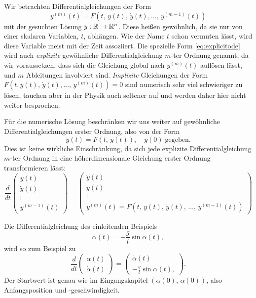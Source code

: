 Wir betrachten Differentialgleichungen der Form
\begin{equation}
  \label{eq:explicitode}
  y^{(m)}(t) = F(t,\, y(t),\, \dot y(t), \ldots,\, y^{(m-1)}(t))
\end{equation}
mit der gesuchten Lösung $y:\mathbb{R}\to\mathbb{R}^n$. Diese heißen gewöhnlich, da
sie nur von einer skalaren Variablen, $t$, abhängen. Wie der Name $t$
schon vermuten lässt, wird diese Variable meist mit der Zeit
assoziiert. Die spezielle Form \eqref{eq:explicitode} wird auch
\emph{explizite} gewöhnliche Differentialgleichung $m$-ter Ordnung
genannt, da wir voraussetzen, dass sich die Gleichung global nach
$y^{(m)}(t)$ auflösen lässt, und $m$ Ableitungen involviert
sind. \emph{Implizite} Gleichungen der Form $F(t, y(t),\,\dot y(t),
\ldots,\,y^{(m)}(t)) = 0$ sind numerisch sehr viel schwieriger zu
lösen, tauchen aber in der Physik auch seltener auf und werden daher
hier nicht weiter besprochen.

Für die numerische Lösung beschränken wir uns weiter auf gewöhnliche
Differentialgleichungen erster Ordnung, also von der Form
\begin{equation}
  \label{eq:1storderode}
  \dot y(t) = F(t,\,y(t)),\quad y(0)\;\text{gegeben}.
\end{equation}
Dies ist keine wirkliche Einschränkung, da sich jede explizite
Differentialgleichung $m$-ter Ordnung in eine höherdimensionale
Gleichung erster Ordnung transformieren lässt:
\begin{equation}
  \frac{d}{dt}\begin{pmatrix}
    y(t)\\
    \dot y(t)\\
    \vdots\\
    y^{(m-1)}(t)
  \end{pmatrix}
  =
  \begin{pmatrix}
    \dot y(t)\\
    \ddot y(t)\\
    \vdots\\
    y^{(m)}(t) = F(t,\, y(t),\, \dot y(t),\, \ldots,\, y^{(m-1)}(t))
  \end{pmatrix}
\end{equation}

Die Differentialgleichung des einleitenden Beispiels
\begin{equation}
  \label{eq:fadenpendel2}
  \ddot \alpha(t) = -\frac{g}{l}\sin \alpha(t),
\end{equation}
wird so zum Beispiel zu
\begin{equation}
  \frac{d}{dt}\begin{pmatrix}
    \alpha(t)\\
    \dot \alpha(t)
  \end{pmatrix}
  =
  \begin{pmatrix}
    \dot \alpha(t)\\
    -\frac{g}{l}\sin \alpha(t),
  \end{pmatrix}.
\end{equation}  
Der Startwert ist genau wie im Eingangskapitel $(\alpha(0),\, \dot
\alpha(0))$, also Anfangsposition und -geschwindigkeit.

